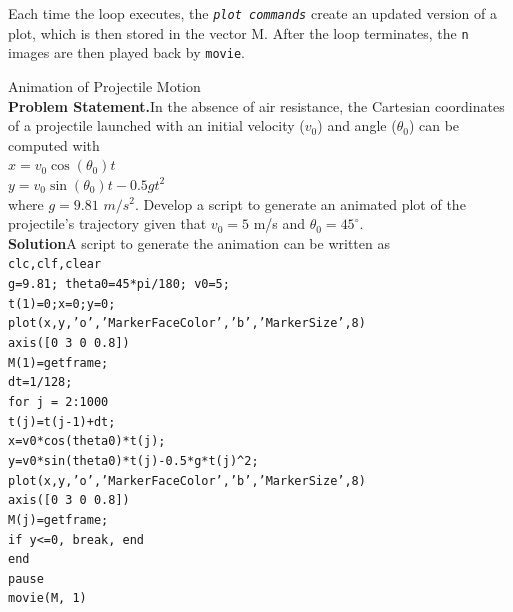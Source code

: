 \documentclass[../main.tex]{subfiles}
\begin{document}
Each time the loop executes, the \texttt{\emph{plot commands}} create an updated version of a plot,
which is then stored in the vector M. After the loop terminates, the \texttt{n} images are then played
back by \texttt{movie}.\\

\begin{example} Animation of Projectile Motion
    \bigskip\\
    \textbf{Problem Statement.}\quad In the absence of air resistance, the Cartesian coordinates of a projectile
    launched with an initial velocity ($v_0$) and angle ($\theta_0$) can be computed with\\
    
    $x = v_0 \cos(\theta_0)t$\\
    \indent
    $y = v_0 \sin(\theta_0)t - 0.5gt^2$\\

    \noindent where $g = 9.81$ $m/s^2$. Develop a script to generate an animated plot of the projectile's
    trajectory given that $v_0 = 5$ m/s and $\theta_0 = 45^{\circ}$.\\

    \noindent\textbf{Solution}\quad A script to generate the animation can be written as\\

    \texttt{clc,clf,clear\\
    \indent g=9.81; theta0=45*pi/180; v0=5;\\
    \indent t(1)=0;x=0;y=0;\\
    \indent plot(x,y,'o','MarkerFaceColor','b','MarkerSize',8)\\
    \indent axis([0 3 0 0.8])\\
    \indent M(1)=getframe;\\
    \indent dt=1/128;\\
    \indent for j = 2:1000\\
    \indent\hspace{2mm} t(j)=t(j-1)+dt;\\
    \indent\hspace{2mm} x=v0*cos(theta0)*t(j);\\
    \indent\hspace{2mm} y=v0*sin(theta0)*t(j)-0.5*g*t(j)\textasciicircum2;\\
    \indent\hspace{2mm} plot(x,y,'o','MarkerFaceColor','b','MarkerSize',8)\\
    \indent\hspace{2mm} axis([0 3 0 0.8])\\
    \indent\hspace{2mm} M(j)=getframe;\\
    \indent\hspace{2mm} if y<=0, break, end\\
    \indent end\\
    \indent pause\\
    \indent movie(M, 1)}\\


\end{example}
\end{document}
